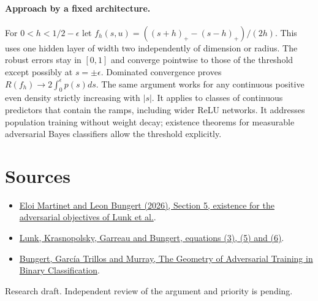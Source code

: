 \documentclass[10pt]{article}
\begin{document}
\paragraph{Approach by a fixed architecture.} For $0<h<1/2-\epsilon$ let
$f_h(s,u)=((s+h)_+-(s-h)_+)/(2h)$. This uses one hidden layer of width two independently of dimension or radius. The robust errors stay in $[0,1]$ and converge pointwise to those of the threshold except possibly at $s=\pm\epsilon$. Dominated convergence proves $R(f_h)\to 2\int_0^\epsilon p(s)ds$. The same argument works for any continuous positive even density strictly increasing with $|s|$. It applies to classes of continuous predictors that contain the ramps, including wider ReLU networks. It addresses population training without weight decay; existence theorems for measurable adversarial Bayes classifiers allow the threshold explicitly.

\section*{Sources}
\begin{itemize}
\item \href{https://arxiv.org/abs/2611.09887}{Eloi Martinet and Leon Bungert (2026), Section 5, existence for the adversarial objectives of Lunk et al.}.
\item \href{https://arxiv.org/abs/2610.10666}{Lunk, Krasnopolsky, Garreau and Bungert, equations (3), (5) and (6)}.
\item \href{https://arxiv.org/abs/2111.13613}{Bungert, García Trillos and Murray, The Geometry of Adversarial Training in Binary Classification}.
\end{itemize}
{\small Research draft. Independent review of the argument and priority is pending.}
\end{document}
